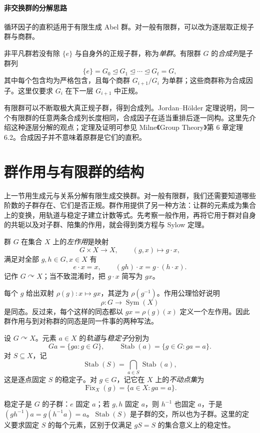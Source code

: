 \documentclass[lang=cn,a4paper,fontset=none,zihao=false,10pt,openany,twoside]{beautybook}
\numberwithin{algorithm}{chapter}
\begin{document}
\paragraph{非交换群的分解思路}
循环因子的直积适用于有限生成 Abel 群。对一般有限群，可以改为逐层取正规子群与商群。
\begin{definition}[单群与合成列]
非平凡群若没有除 $\{e\}$ 与自身外的正规子群，称为\emph{单群}。有限群 $G$ 的\emph{合成列}是子群列
\[
 \{e\}=G_0\trianglelefteq G_1\trianglelefteq\cdots\trianglelefteq G_t=G,
\]
其中每个包含均为严格包含，且每个商群 $G_{i+1}/G_i$ 为单群；这些商群称为合成因子。这里仅要求 $G_i$ 在下一层 $G_{i+1}$ 中正规。
\end{definition}
\begin{remark}
有限群可以不断取极大真正规子群，得到合成列。Jordan--Hölder 定理说明，同一个有限群的任意两条合成列长度相同，合成因子在适当重排后逐一同构。这里先介绍这种逐层分解的观点；定理及证明可参见 Milne《Group Theory》第 6 章定理 6.2。合成因子并不意味着原群是它们的直积。
\end{remark}

\section{群作用与有限群的结构}\label{sec:sylow-route}
上一节用生成元与关系分解有限生成交换群。对一般有限群，我们还需要知道哪些阶数的子群存在、它们是否正规。群作用提供了另一种方法：让群的元素成为集合上的变换，用轨道与稳定子建立计数等式。先考察一般作用，再将它用于群对自身的共轭以及对子群、陪集的作用，就会得到类方程与 Sylow 定理。
\begin{definition}[左群作用]
群 $G$ 在集合 $X$ 上的\emph{左作用}是映射
\[
 G\times X\longrightarrow X,\qquad(g,x)\longmapsto g\cdot x,
\]
满足对全部 $g,h\in G,x\in X$ 有
\[
 e\cdot x=x,\qquad(gh)\cdot x=g\cdot(h\cdot x).
\]
记作 $G\curvearrowright X$；当不致混淆时，把 $g\cdot x$ 简写为 $gx$。
\end{definition}
每个 $g$ 给出双射 $\rho(g):x\mapsto gx$，其逆为 $\rho(g^{-1})$。作用公理恰好说明
\[
 \rho:G\longrightarrow\operatorname{Sym}(X)
\]
是同态。反过来，每个这样的同态都以 $gx=\rho(g)(x)$ 定义一个左作用。因此群作用与到对称群的同态是同一件事的两种写法。

\begin{definition}[轨道、稳定子与不动点]
设 $G\curvearrowright X$。元素 $a\in X$ 的\emph{轨道}与\emph{稳定子}分别为
\[
 Ga=\{ga:g\in G\},\qquad
 \operatorname{Stab}(a)=\{g\in G:ga=a\}.
\]
对 $S\subseteq X$，记
\[
 \operatorname{Stab}(S)=\bigcap_{a\in S}\operatorname{Stab}(a),
\]
这是逐点固定 $S$ 的稳定子。对 $g\in G$，记它在 $X$ 上的\emph{不动点集}为
\[
 \operatorname{Fix}_X(g)=\{a\in X:ga=a\}.
\]
\end{definition}
稳定子是 $G$ 的子群：$e$ 固定 $a$；若 $g,h$ 固定 $a$，则 $h^{-1}$ 也固定 $a$，于是 $(gh^{-1})a=g(h^{-1}a)=a$。$\operatorname{Stab}(S)$ 是子群的交，所以也为子群。这里的定义要求固定 $S$ 的每个元素，区别于仅满足 $gS=S$ 的集合意义上的稳定性。
\end{document}
